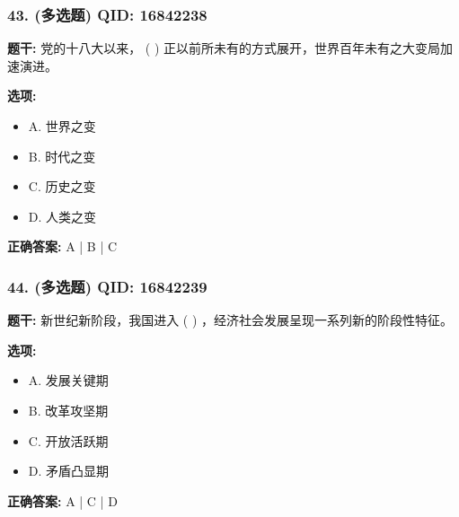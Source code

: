\documentclass[12pt,UTF8]{ctexart}
\begin{document}
\vspace{0.3em}\hrulefill\vspace{0.7em}

\subsubsection*{43. (多选题) \small QID: 16842238}

\textbf{题干:}
党的十八大以来， ( ) 正以前所未有的方式展开，世界百年未有之大变局加速演进。

\textbf{选项:}
\begin{itemize}[leftmargin=*]

  \item A. 世界之变

  \item B. 时代之变

  \item C. 历史之变

  \item D. 人类之变

\end{itemize}

\textbf{正确答案:}
A | B | C

\vspace{0.3em}\hrulefill\vspace{0.7em}

\subsubsection*{44. (多选题) \small QID: 16842239}

\textbf{题干:}
新世纪新阶段，我国进入 ( ) ，经济社会发展呈现一系列新的阶段性特征。

\textbf{选项:}
\begin{itemize}[leftmargin=*]

  \item A. 发展关键期

  \item B. 改革攻坚期

  \item C. 开放活跃期

  \item D. 矛盾凸显期

\end{itemize}

\textbf{正确答案:}
A | C | D

\vspace{0.3em}\hrulefill\vspace{0.7em}
\end{document}
